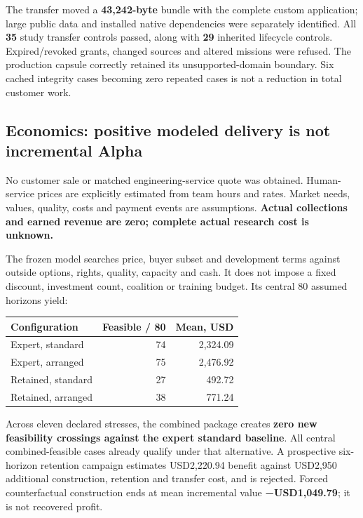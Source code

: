 \documentclass[
  10pt,
]{article}
\let\OriginalSubsection\subsection
\renewcommand{\subsection}{\needspace{6\baselineskip}\OriginalSubsection}
\begin{document}
The transfer moved a \textbf{43,242-byte} bundle with the complete
custom application; large public data and installed native dependencies
were separately identified. All \textbf{35} study transfer controls
passed, along with \textbf{29} inherited lifecycle controls.
Expired/revoked grants, changed sources and altered missions were
refused. The production capsule correctly retained its
unsupported-domain boundary. Six cached integrity cases becoming zero
repeated cases is not a reduction in total customer work.

\hypertarget{economics-positive-modeled-delivery-is-not-incremental-alpha}{%
\subsection{Economics: positive modeled delivery is not incremental
Alpha}\label{economics-positive-modeled-delivery-is-not-incremental-alpha}}

No customer sale or matched engineering-service quote was obtained.
Human-service prices are explicitly estimated from team hours and rates.
Market needs, values, quality, costs and payment events are assumptions.
\textbf{Actual collections and earned revenue are zero; complete actual
research cost is unknown.}

The frozen model searches price, buyer subset and development terms
against outside options, rights, quality, capacity and cash. It does not
impose a fixed discount, investment count, coalition or training budget.
Its central 80 assumed horizons yield:

\begin{longtable}[]{@{}lrr@{}}
\toprule\noalign{}
Configuration & Feasible / 80 & Mean, USD \\
\midrule\noalign{}
\endhead
\bottomrule\noalign{}
\endlastfoot
Expert, standard & 74 & 2,324.09 \\
Expert, arranged & 75 & 2,476.92 \\
Retained, standard & 27 & 492.72 \\
Retained, arranged & 38 & 771.24 \\
\end{longtable}

Across eleven declared stresses, the combined package creates
\textbf{zero new feasibility crossings against the expert standard
baseline}. All central combined-feasible cases already qualify under
that alternative. A prospective six-horizon retention campaign estimates
USD2,220.94 benefit against USD2,950 additional construction, retention
and transfer cost, and is rejected. Forced counterfactual construction
ends at mean incremental value \textbf{−USD1,049.79}; it is not
recovered profit.
\end{document}
